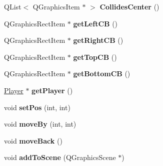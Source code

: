 \begin{DoxyCompactItemize}
\item 
\hypertarget{class_pingouin_a10126ab2598c56da1fe96bae1bedf9a7}{}Q\+List$<$ Q\+Graphics\+Item $\ast$ $>$ {\bfseries Collides\+Center} ()\label{class_pingouin_a10126ab2598c56da1fe96bae1bedf9a7}

\item 
\hypertarget{class_pingouin_aaa130c988fb99be84ae8ce057ff0466f}{}Q\+Graphics\+Rect\+Item $\ast$ {\bfseries get\+Left\+C\+B} ()\label{class_pingouin_aaa130c988fb99be84ae8ce057ff0466f}

\item 
\hypertarget{class_pingouin_a840603a098f62619f3cf6aef3ff71500}{}Q\+Graphics\+Rect\+Item $\ast$ {\bfseries get\+Right\+C\+B} ()\label{class_pingouin_a840603a098f62619f3cf6aef3ff71500}

\item 
\hypertarget{class_pingouin_a04bb88b6251aa853e1980c35005f7df8}{}Q\+Graphics\+Rect\+Item $\ast$ {\bfseries get\+Top\+C\+B} ()\label{class_pingouin_a04bb88b6251aa853e1980c35005f7df8}

\item 
\hypertarget{class_pingouin_aafa634e4ec962a442b5a4fdf1d029464}{}Q\+Graphics\+Rect\+Item $\ast$ {\bfseries get\+Bottom\+C\+B} ()\label{class_pingouin_aafa634e4ec962a442b5a4fdf1d029464}

\item 
\hypertarget{class_pingouin_ae8bf1799a91f7c7863731ddcfe1b1418}{}\hyperlink{class_player}{Player} $\ast$ {\bfseries get\+Player} ()\label{class_pingouin_ae8bf1799a91f7c7863731ddcfe1b1418}

\item 
\hypertarget{class_pingouin_a91f0120d2ee61c6a6ca715a8e88f3d3b}{}void {\bfseries set\+Pos} (int, int)\label{class_pingouin_a91f0120d2ee61c6a6ca715a8e88f3d3b}

\item 
\hypertarget{class_pingouin_a80aa8b486de1bba6c637a8ab0233fc10}{}void {\bfseries move\+By} (int, int)\label{class_pingouin_a80aa8b486de1bba6c637a8ab0233fc10}

\item 
\hypertarget{class_pingouin_a6b74f3acac4cce611992586356805d4a}{}void {\bfseries move\+Back} ()\label{class_pingouin_a6b74f3acac4cce611992586356805d4a}

\item 
\hypertarget{class_pingouin_a90eef5bc5b47bdae1508f572d1d898d5}{}void {\bfseries add\+To\+Scene} (Q\+Graphics\+Scene $\ast$)\label{class_pingouin_a90eef5bc5b47bdae1508f572d1d898d5}


\end{DoxyCompactItemize}

